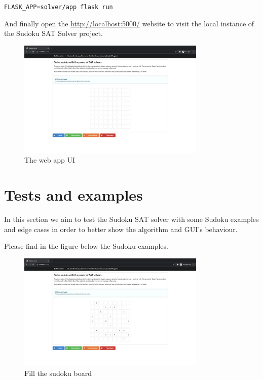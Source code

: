 \documentclass[]{usiinfprospectus}
\begin{document}
\begin{center}
\texttt{FLASK\_APP=solver/app flask run}
\end{center}

\noindent
And finally open the \url{http://localhost:5000/} website to visit the local
instance of the Sudoku SAT Solver project.

\begin{figure}[ht]
\centering
\includegraphics[width=0.8\textwidth]{pics/app_ui.png}
\caption{The web app UI}
\end{figure}

\newpage

\section{Tests and examples}\label{trials}

In this section we aim to test the Sudoku SAT solver with some Sudoku examples
and edge cases in order to better show the algorithm and GUI's behaviour.

Please
find in the figure below the Sudoku examples.

\begin{figure}[ht]
\centering
\includegraphics[width=0.8\textwidth]{pics/fill_board.png}
\caption{Fill the sudoku board}
\end{figure}
\end{document}
